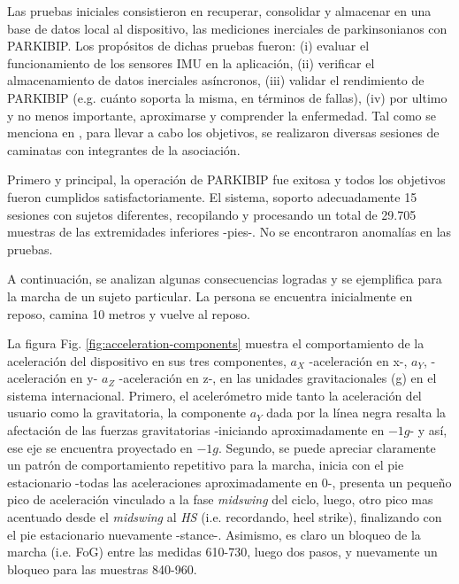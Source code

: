 Las pruebas iniciales consistieron en recuperar, consolidar y almacenar en una base de datos local al dispositivo, las mediciones inerciales de parkinsonianos con PARKIBIP. Los propósitos de dichas pruebas fueron: (i) evaluar el funcionamiento de los sensores IMU en la aplicación, (ii) verificar el almacenamiento de datos inerciales asíncronos, (iii) validar el rendimiento de PARKIBIP (e.g. cuánto soporta la misma, en términos de fallas), (iv) por ultimo y no menos importante, aproximarse y comprender la enfermedad. Tal como se menciona en , para llevar a cabo los objetivos, se realizaron diversas sesiones de caminatas con integrantes de la asociación.

\noindent Primero y principal, la operación de PARKIBIP fue exitosa y todos los objetivos fueron cumplidos satisfactoriamente. El sistema, soporto adecuadamente 15 sesiones con sujetos diferentes, recopilando y procesando un total de 29.705 muestras de las extremidades inferiores -pies-. No se encontraron anomalías en las pruebas. 

A continuación, se analizan algunas consecuencias logradas y se ejemplifica para la marcha de un sujeto particular. La persona se encuentra inicialmente en reposo, camina 10 metros y vuelve al reposo.

La figura Fig. \ref{fig:acceleration-components} muestra el comportamiento de la aceleración del dispositivo en sus tres componentes, $a_X$ -aceleración en x-, $a_Y$, -aceleración en y- $a_Z$ -aceleración en z-, en las unidades gravitacionales (g) en el sistema internacional. Primero, el acelerómetro mide tanto la aceleración del usuario como la gravitatoria, la componente $a_Y$ dada por la línea negra resalta la afectación de las fuerzas gravitatorias  -iniciando aproximadamente en $-1g$- y así, ese eje se encuentra proyectado en $-1g$. Segundo, se puede apreciar claramente un patrón de comportamiento repetitivo para la marcha, inicia con el pie estacionario -todas las aceleraciones aproximadamente en 0-, presenta un pequeño pico de aceleración vinculado a la fase \textit{midswing} del ciclo, luego, otro pico mas acentuado desde el \textit{midswing} al \textit{HS} (i.e. recordando, heel strike), finalizando con el pie estacionario nuevamente -stance-. Asimismo, es claro un bloqueo de la marcha (i.e. FoG) entre las medidas 610-730, luego dos pasos, y nuevamente un bloqueo para las muestras 840-960.

